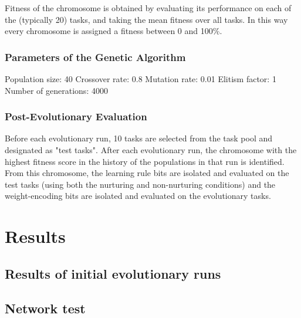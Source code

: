 \documentclass[master]{outhesis}
\begin{document}
Fitness of the chromosome is obtained by evaluating its performance on each of the (typically 20) tasks, and taking the mean fitness over all tasks. In this way every chromosome is assigned a fitness between 0 and 100\%.

\subsection{Parameters of the Genetic Algorithm}


Population size: 40
Crossover rate: 0.8
Mutation rate: 0.01
Elitism factor: 1
Number of generations: 4000

\subsection{Post-Evolutionary Evaluation}

Before each evolutionary run, 10 tasks are selected from the task pool and designated as "test tasks". After each evolutionary run, the chromosome with the highest fitness score in the history of the populations in that run is identified. From this chromosome, the learning rule bits are isolated and evaluated on the test tasks (using both the nurturing and non-nurturing conditions) and the weight-encoding bits are isolated and evaluated on the evolutionary tasks.

\chapter{Results}

\section{Results of initial evolutionary runs}

\section{Network test}
\end{document}
